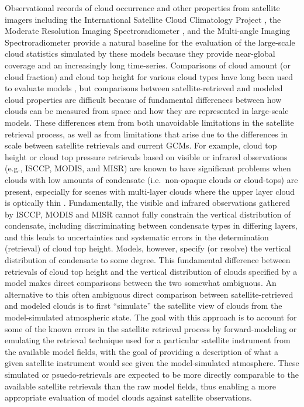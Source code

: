 Observational records of cloud occurrence and other properties from
satellite imagers including the International Satellite Cloud
Climatology Project \citep[ISCCP;][]{rossow_and_schiffer_1999}, the
Moderate Resolution Imaging Spectroradiometer
\citep[MODIS;][]{king_et_al_2003}, and the Multi-angle Imaging
Spectroradiometer \citep[MISR;][]{diner_et_al_2002, diner_et_al_2005}
provide a natural baseline for the evaluation of the large-scale cloud
statistics simulated by these models because they provide near-global
coverage and an increasingly long time-series. Comparisons of cloud
amount (or cloud fraction) and cloud top height for various cloud types
have long been used to evaluate models
\citep{klein_and_jakob_1999, webb_et_al_2001, norris_and_weaver_2001, lin_and_zhang_2004, zhang_et_al_2005, wyant_et_al_2006, gleckler_et_al_2008, marchand_and_ackerman_2010, pincus_et_al_2012, kay_et_al_2012, klein_et_al_2013},
but comparisons between satellite-retrieved and modeled cloud properties
are difficult because of fundamental differences between how clouds can
be measured from space and how they are represented in large-scale
models. These differences stem from both unavoidable limitations in the
satellite retrieval process, as well as from limitations that arise due
to the differences in scale between satellite retrievals and current
GCMs. For example, cloud top height or cloud top pressure retrievals
based on visible or infrared observations (e.g., ISCCP, MODIS, and MISR)
are known to have significant problems when clouds with low amounts of
condensate (i.e.~non-opaque clouds or cloud-tops) are present,
especially for scenes with multi-layer clouds where the upper layer
cloud is optically thin \citep{marchand_et_al_2010, pincus_et_al_2012}.
Fundamentally, the visible and infrared observations gathered by ISCCP,
MODIS and MISR cannot fully constrain the vertical distribution of
condensate, including discriminating between condensate types in
differing layers, and this leads to uncertainties and systematic errors
in the determination (retrieval) of cloud top height. Models, however,
specify (or resolve) the vertical distribution of condensate to some
degree. This fundamental difference between retrievals of cloud top
height and the vertical distribution of clouds specified by a model
makes direct comparisons between the two somewhat ambiguous. An
alternative to this often ambiguous direct comparison between
satellite-retrieved and modeled clouds is to first ``simulate'' the
satellite view of clouds from the model-simulated atmospheric state. The
goal with this approach is to account for some of the known errors in
the satellite retrieval process by forward-modeling or emulating the
retrieval technique used for a particular satellite instrument from the
available model fields, with the goal of providing a description of what
a given satellite instrument would see given the model-simulated
atmosphere. These simulated or psuedo-retrievals are expected to be more
directly comparable to the available satellite retrievals than the raw
model fields, thus enabling a more appropriate evaluation of model
clouds against satellite observations.

